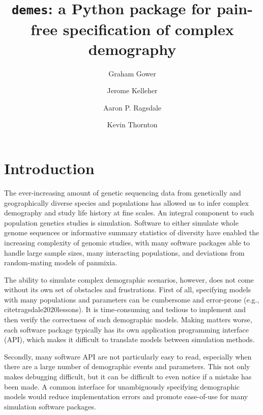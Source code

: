 \documentclass[11pt]{article}
\newcommand{\demes}[0]{\texttt{demes}}
\begin{document}
\title{\demes: a Python package for pain-free specification of complex demography}
\author[1,*]{Graham Gower}
\author[2,*]{Jerome Kelleher}
\author[3,*]{Aaron P. Ragsdale}
\author[4,*]{Kevin Thornton}
\affil[1]{}
\affil[2]{}
\affil[3]{}
\affil[4]{}
\maketitle


\section*{Introduction}

The ever-increasing amount of genetic sequencing data from genetically and
geographically diverse species and populations has allowed us to
infer complex demography and study life history at fine scales. An integral
component to such population genetics studies is simulation. Software to
either simulate whole genome sequences
\citep{thornton2014c++,kelleher2016efficient,haller2019slim,adrion2020community}
or informative summary statistics of diversity
\citep{gutenkunst2009inferring,kamm2017efficient,jouganous2017inferring}
have enabled the increasing complexity of genomic studies, with many software
packages able to handle large sample sizes, many interacting populations, and
deviations from random-mating models of panmixia.

The ability to simulate complex demographic scenarios, however, does not come
without its own set of obstacles and frustrations. First of all, specifying models
with many populations and parameters can be cumbersome and error-prone
(e.g., citet{ragsdale2020lessons}). It is
time-consuming and tedious to implement and then verify the correctness
of such demographic models. Making matters worse, each software package typically has
its own application programming interface (API), which makes it difficult to translate
models between simulation methods.

Secondly, many software API are not particularly easy to read, especially when there
are a large number of demographic events and parameters. This not only makes
debugging difficult, but it can be difficult to even notice if a mistake has been
made. A common interface for unambiguously specifying demographic
models would reduce implementation errors and promote ease-of-use for many simulation
software packages.
\end{document}
